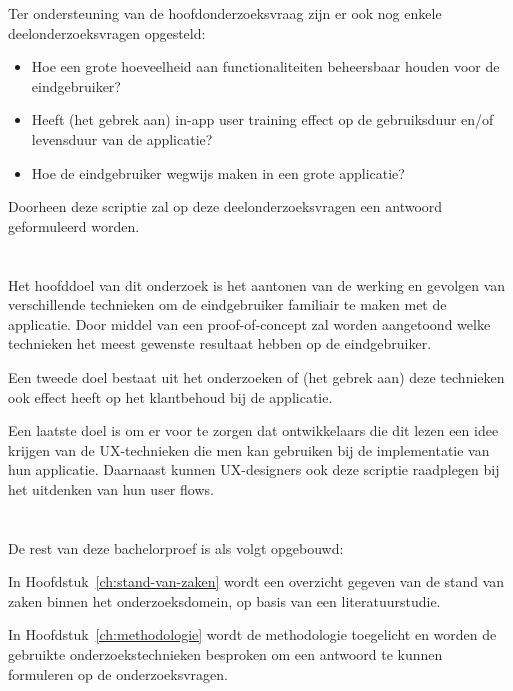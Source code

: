 Ter ondersteuning van de hoofdonderzoeksvraag zijn er ook nog enkele deelonderzoeksvragen opgesteld:

\begin{itemize}
    \item Hoe een grote hoeveelheid aan functionaliteiten beheersbaar houden voor de eindgebruiker?
    \item Heeft (het gebrek aan) in-app user training effect op de gebruiksduur en/of levensduur van de applicatie?
    \item Hoe de eindgebruiker wegwijs maken in een grote applicatie?
\end{itemize}

Doorheen deze scriptie zal op deze deelonderzoeksvragen een antwoord geformuleerd worden.

\section{}
\label{sec:onderzoeksdoelstelling}

Het hoofddoel van dit onderzoek is het aantonen van de werking en gevolgen van verschillende technieken om de eindgebruiker familiair te maken met de applicatie. Door middel van een proof-of-concept zal worden aangetoond welke technieken het meest gewenste resultaat hebben op de eindgebruiker.

Een tweede doel bestaat uit het onderzoeken of (het gebrek aan) deze technieken ook effect heeft op het klantbehoud bij de applicatie.

Een laatste doel is om er voor te zorgen dat ontwikkelaars die dit lezen een idee krijgen van de UX-technieken die men kan gebruiken bij de implementatie van hun applicatie. Daarnaast kunnen UX-designers ook deze scriptie raadplegen bij het uitdenken van hun user flows.

\section{}
\label{sec:opzet-bachelorproef}

De rest van deze bachelorproef is als volgt opgebouwd:

In Hoofdstuk~\ref{ch:stand-van-zaken} wordt een overzicht gegeven van de stand van zaken binnen het onderzoeksdomein, op basis van een literatuurstudie.

In Hoofdstuk~\ref{ch:methodologie} wordt de methodologie toegelicht en worden de gebruikte onderzoekstechnieken besproken om een antwoord te kunnen formuleren op de onderzoeksvragen.

